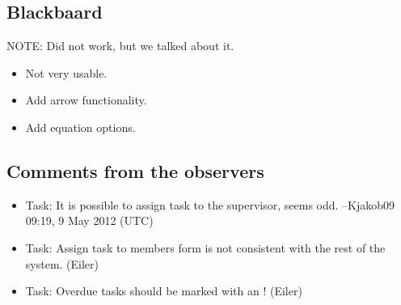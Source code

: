 \subsection*{Blackbaard}
NOTE: Did not work, but we talked about it.

\begin{itemize}
	\item Not very usable.
	\item Add arrow functionality.
	\item Add equation options.
\end{itemize}


\subsection*{Comments from the observers}
\begin{itemize}
	\item Task: It is possible to assign task to the supervisor, seems odd. --Kjakob09 09:19, 9 May 2012 (UTC)
	\item Task: Assign task to members form is not consistent with the rest of the system. (Eiler)
	\item Task: Overdue tasks should be marked with an ! (Eiler)
\end{itemize}

